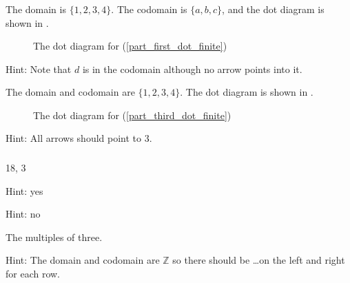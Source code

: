 \subsubsection*{ \answers}
\begin{apart}
    \item The domain is $\{1,2,3,4\}$.  The codomain is $\{a,b,c\}$, and the dot diagram is shown in .

    \begin{figure}[hbtp]
        \centering
        
        \caption{The dot diagram for  (\ref{part_first_dot_finite})}
        \label{fig_answer_exer_domain_codomain_finite}
    \end{figure}

    \item Hint:  Note that $d$ is in the codomain although no arrow points into it.
    \item The domain and codomain are $\{1,2,3,4\}$. The dot diagram is shown in .

    \begin{figure}[hbtp]
        \centering
        
        \caption{The dot diagram for  (\ref{part_third_dot_finite})}
        \label{fig_answer_exer_domain_codomain_finite2}
    \end{figure}

    \item Hint: All arrows should point to 3.
    
\end{apart}

\subsubsection*{ \answers}
\begin{apart}
    \item 18, 3
    \item Hint: yes
    \item Hint: no
    \item The multiples of three.
    \item Hint: The domain and codomain are $\mathbb{Z}$ so there should be \ldots on the left and right for each row.
\end{apart}

